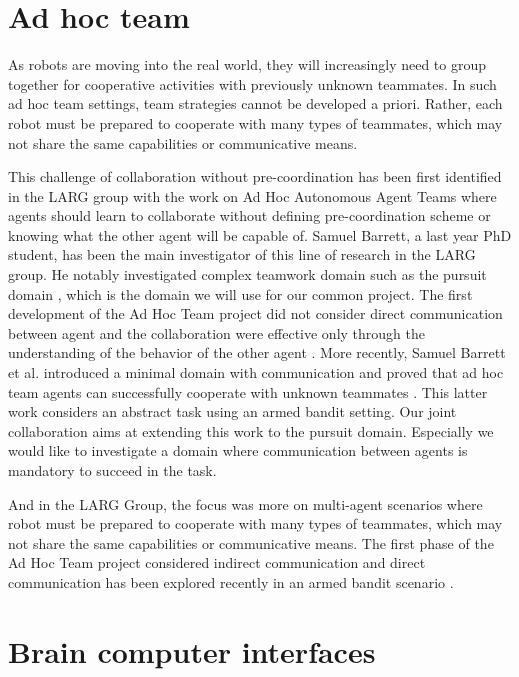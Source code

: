 \section{Ad hoc team}

As robots are moving into the real world, they will increasingly need to group together for cooperative activities with previously unknown teammates. In such ad hoc team settings, team strategies cannot be developed a priori. Rather, each robot must be prepared to cooperate with many types of teammates, which may not share the same capabilities or communicative means. 

This challenge of collaboration without pre-coordination has been first identified in the LARG group with the work on Ad Hoc Autonomous Agent Teams \cite{stone2010ad} where agents should learn to collaborate without defining pre-coordination scheme or knowing what the other agent will be capable of. Samuel Barrett, a last year PhD student, has been the main investigator of this line of research in the LARG group. He notably investigated complex teamwork domain such as the pursuit domain \cite{barrett2011empirical}, which is the domain we will use for our common project. The first development of the Ad Hoc Team project did not consider direct communication between agent \cite{stone2010ad} \cite{barrett2011adhoc} and the collaboration were effective only through the understanding of the behavior of the other agent \cite{barrett2011empirical} \cite{barrett2013team}. More recently, Samuel Barrett et al. introduced a minimal domain with communication and proved that ad hoc team agents can successfully cooperate with unknown teammates \cite{barrett2013communicating}. This latter work considers an abstract task using an armed bandit setting. Our joint collaboration aims at extending this work to the pursuit domain. Especially we would like to investigate a domain where communication between agents is mandatory to succeed in the task. 

And in the LARG Group, the focus was more on multi-agent scenarios where robot must be prepared to cooperate with many types of teammates, which may not share the same capabilities or communicative means. The first phase of the Ad Hoc Team project considered indirect communication \cite{stone2010ad} \cite{barrett2011empirical} \cite{barrett2011adhoc} \cite{barrett2013team} and direct communication has been explored recently in an armed bandit scenario \cite{barrett2013communicating}.

\section{Brain computer interfaces}

